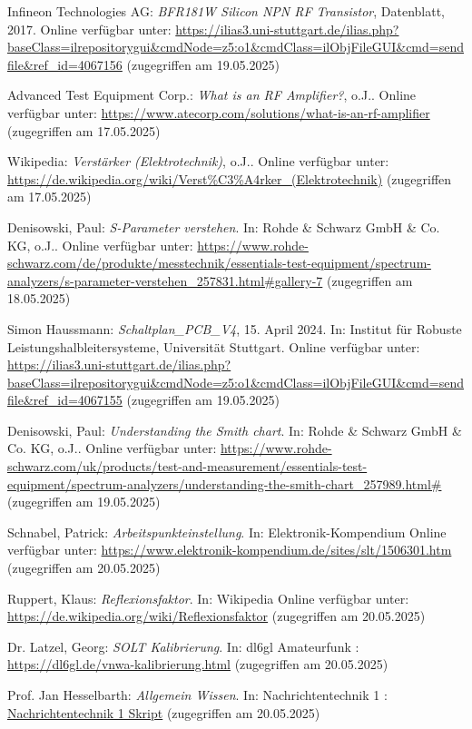 \begin{thebibliography}{1}
Infineon Technologies AG: \emph{BFR181W Silicon NPN RF Transistor}, Datenblatt, 2017. Online verfügbar unter: \url{https://ilias3.uni-stuttgart.de/ilias.php?baseClass=ilrepositorygui&cmdNode=z5:o1&cmdClass=ilObjFileGUI&cmd=sendfile&ref_id=4067156} (zugegriffen am 19.05.2025)

Advanced Test Equipment Corp.: \emph{What is an RF Amplifier?}, o.J.. Online verfügbar unter: \url{https://www.atecorp.com/solutions/what-is-an-rf-amplifier} (zugegriffen am 17.05.2025)

Wikipedia: \emph{Verstärker (Elektrotechnik)}, o.J.. Online verfügbar unter: \url{https://de.wikipedia.org/wiki/Verst%C3%A4rker_(Elektrotechnik)} (zugegriffen am 17.05.2025)

Denisowski, Paul: \emph{S-Parameter verstehen}. In: Rohde \& Schwarz GmbH \& Co. KG, o.J.. Online verfügbar unter: \url{https://www.rohde-schwarz.com/de/produkte/messtechnik/essentials-test-equipment/spectrum-analyzers/s-parameter-verstehen_257831.html#gallery-7} (zugegriffen am 18.05.2025)

Simon Haussmann: \emph{Schaltplan\_PCB\_V4}, 15. April 2024. In: Institut für Robuste Leistungshalbleitersysteme, Universität Stuttgart. Online verfügbar unter: \url{https://ilias3.uni-stuttgart.de/ilias.php?baseClass=ilrepositorygui&cmdNode=z5:o1&cmdClass=ilObjFileGUI&cmd=sendfile&ref_id=4067155} (zugegriffen am 19.05.2025)


Denisowski, Paul: \emph{Understanding the Smith chart}. In: Rohde \& Schwarz GmbH \& Co. KG, o.J.. Online verfügbar unter: \url{https://www.rohde-schwarz.com/uk/products/test-and-measurement/essentials-test-equipment/spectrum-analyzers/understanding-the-smith-chart_257989.html#} (zugegriffen am 19.05.2025)

Schnabel, Patrick: \emph{Arbeitspunkteinstellung}. In: Elektronik-Kompendium Online verfügbar unter: \url{https://www.elektronik-kompendium.de/sites/slt/1506301.htm} (zugegriffen am 20.05.2025)

Ruppert, Klaus: \emph{Reflexionsfaktor}. In: Wikipedia Online verfügbar unter: \url{https://de.wikipedia.org/wiki/Reflexionsfaktor} (zugegriffen am 20.05.2025)

Dr.  Latzel, Georg: \emph{SOLT Kalibrierung}. In: dl6gl Amateurfunk : \url{https://dl6gl.de/vnwa-kalibrierung.html} (zugegriffen am 20.05.2025)

Prof. Jan Hesselbarth: \emph{Allgemein Wissen}. In: Nachrichtentechnik 1 : \url{Nachrichtentechnik 1 Skript} (zugegriffen am 20.05.2025)

\end{thebibliography}

%
\clearpage
